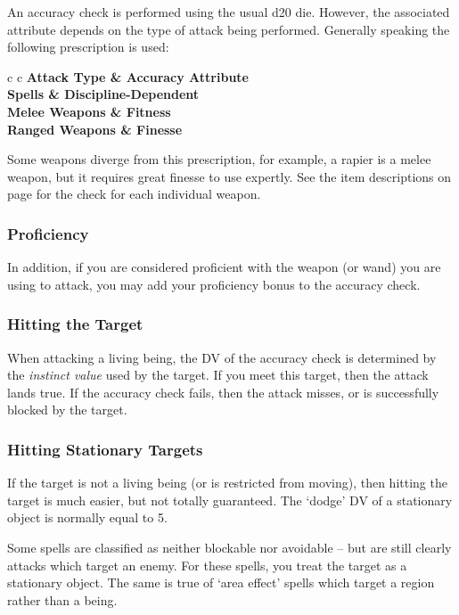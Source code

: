 An accuracy check is performed using the usual d20 die. However, the associated attribute depends on the type of attack being performed. Generally speaking the following prescription is used:

\begin{center}
\begin{rndtable}{c c}
\bf Attack Type	&	\bf Accuracy Attribute
\\
Spells	&	Discipline-Dependent
\\
Melee Weapons	& Fitness
\\
Ranged Weapons	&	Finesse
\end{rndtable}
\end{center}

Some weapons diverge from this prescription, for example, a rapier is a melee weapon, but it requires great finesse to use expertly. See the item descriptions on page \pageref{S:WeaponList} for the check for each individual weapon. 

\subsubsection{Proficiency}

In addition, if you are considered proficient with the weapon (or wand) you are using to attack, you may add your proficiency bonus to the accuracy check. 

\subsubsection{Hitting the Target}

When attacking a living being, the DV of the accuracy check is determined by the {\it instinct value} used by the target. If you meet this target, then the attack lands true. If the accuracy check fails, then the attack misses, or is successfully blocked by the target. 

\subsubsection{Hitting Stationary Targets}

If the target is not a living being (or is restricted from moving), then hitting the target is much easier, but not totally guaranteed. The `dodge' DV of a stationary object is normally equal to 5. 

Some spells are classified as neither blockable nor avoidable -- but are still clearly attacks which target an enemy. For these spells, you treat the target as a stationary object. The same is true of `area effect' spells which target a region rather than a being. 

